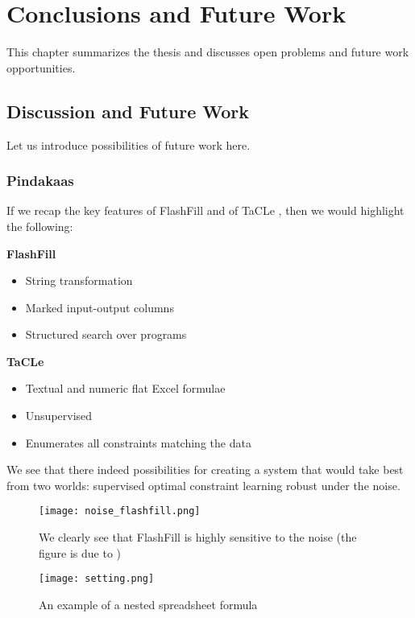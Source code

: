 \chapter{Conclusions and Future Work}\label{ch:conclusions}
\begin{addmargin}[2em]{2em}
This chapter summarizes the thesis and discusses open problems and
future work opportunities.
\end{addmargin}

\section{Discussion and Future Work}
Let us introduce possibilities of future work here.

\subsection{Pindakaas}
If we recap the key features of FlashFill \parencite{flashfill} and of TaCLe
\parencite{tacle}, then we would highlight the following:

\textbf{FlashFill}
\begin{itemize}
\item String transformation
\item Marked input-output columns
\item Structured search over programs
\end{itemize}

\textbf{TaCLe}
\begin{itemize}
  \item Textual and numeric flat Excel formulae
  \item Unsupervised
  \item Enumerates all constraints matching the data
\end{itemize}

We see that there indeed possibilities for creating a system that
would take best from two worlds: supervised optimal constraint
learning robust under the noise.

\begin{figure}[htb]
 \centering
 \texttt{[image: noise\_flashfill.png]}
 \caption{We clearly see that FlashFill is highly sensitive to the
   noise (the figure is due to \cite{robustfill})}
  \label{fig:flashfill_noise}
\end{figure}

\begin{figure}[htb]
 \centering
 \texttt{[image: setting.png]}
 \caption{An example of a nested spreadsheet formula}
  \label{fig:nested_formula}
\end{figure}

